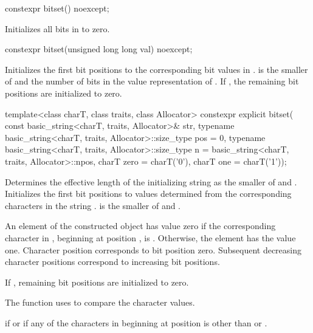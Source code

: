 %
\begin{itemdecl}
constexpr bitset() noexcept;
\end{itemdecl}

\begin{itemdescr}
\pnum
\effects
Initializes all bits in  to zero.
\end{itemdescr}

%
\begin{itemdecl}
constexpr bitset(unsigned long long val) noexcept;
\end{itemdecl}

\begin{itemdescr}
\pnum
\effects
Initializes the first  bit positions to the corresponding bit
values in .
 is the smaller of  and the number of bits in the value
representation of .
If , the remaining bit positions are initialized to zero.
\end{itemdescr}

%
\begin{itemdecl}
template<class charT, class traits, class Allocator>
  constexpr explicit bitset(
    const basic_string<charT, traits, Allocator>& str,
    typename basic_string<charT, traits, Allocator>::size_type pos = 0,
    typename basic_string<charT, traits, Allocator>::size_type n
      = basic_string<charT, traits, Allocator>::npos,
    charT zero = charT('0'),
    charT one = charT('1'));
\end{itemdecl}

\begin{itemdescr}
\pnum
\effects
Determines the effective length
 of the initializing string as the smaller of
 and
.
Initializes the first  bit
positions to values determined from the corresponding characters in the string
.
 is the smaller of  and .

\pnum
An element of the constructed object has value zero if the
corresponding character in , beginning at position
, is
.
Otherwise, the element has the value one.
Character position  corresponds to bit position zero.
Subsequent decreasing character positions correspond to increasing bit positions.

\pnum
If , remaining bit positions are initialized to zero.

\pnum
The function uses 
to compare the character values.

\pnum
\throws
{}%
 if  or
%
 if any of
the  characters in 
beginning at position 
is other than  or .
\end{itemdescr}

